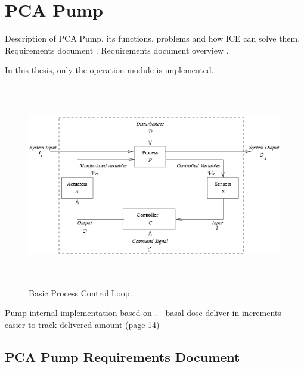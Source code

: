 
\cleardoublepage


\chapter{PCA Pump}
\label{pcapump}

Description of PCA Pump, its functions, problems and how ICE can solve them.
Requirements document \cite{PcaReq}.
Requirements document overview \cite{OpenSourcePCAPump:Paper}.

In this thesis, only the operation module is implemented.


\begin{figure}[ht]%
    \begin{center}
    	\includegraphics[height=3.5in]{figures/safety-critical-loop.png}
    	\caption{Basic Process Control Loop\protect\footnotemark.}
    \end{center}
\end{figure}

Pump internal implementation based on \cite{CADD-PrizmAmbulatoryInfusionPump:Online}.
- basal dose deliver in increments - easier to track delivered amount (page 14)



\section{PCA Pump Requirements Document}
\label{pcapump:requirements-doc}

